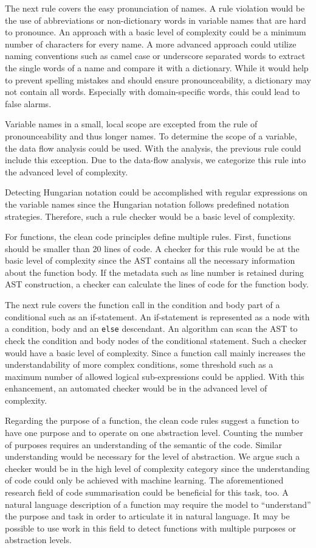 The next rule covers the easy pronunciation of names. A rule violation would be the use of abbreviations or non-dictionary words in variable names that are hard to pronounce. An approach with a basic level of complexity could be a minimum number of characters for every name. A more advanced approach could utilize naming conventions such as camel case or underscore separated words to extract the single words of a name and compare it with a dictionary. While it would help to prevent spelling mistakes and should ensure pronounceability, a dictionary may not contain all words. Especially with domain-specific words, this could lead to false alarms.

Variable names in a small, local scope are excepted from the rule of pronounceability and thus longer names. To determine the scope of a variable, the data flow analysis could be used. With the analysis, the previous rule could include this exception. Due to the data-flow analysis, we categorize this rule into the advanced level of complexity.

Detecting Hungarian notation could be accomplished with regular expressions on the variable names since the Hungarian notation follows predefined notation strategies. Therefore, such a rule checker would be a basic level of complexity.


For functions, the clean code principles define multiple rules. 
First, functions should be smaller than 20 lines of code. A checker for this rule would be at the basic level of complexity since the AST contains all the necessary information about the function body. If the metadata such as line number is retained during AST construction, a checker can calculate the lines of code for the function body.

The next rule covers the function call in the condition and body part of a conditional such as an if-statement. An if-statement is represented as a node with a condition, body and an \texttt{else} descendant. An algorithm can scan the AST to check the condition and body nodes of the conditional statement. Such a checker would have a basic level of complexity. Since a function call mainly increases the understandability of more complex conditions, some threshold such as a maximum number of allowed logical sub-expressions could be applied. With this enhancement, an automated checker would be in the advanced level of complexity.

Regarding the purpose of a function, the clean code rules suggest a function to have one purpose and to operate on one abstraction level. Counting the number of purposes requires an understanding of the semantic of the code. Similar understanding would be necessary for the level of abstraction. We argue such a checker would be in the high level of complexity category since the understanding of code could only be achieved with machine learning. The aforementioned research field of code summarisation could be beneficial for this task, too. A natural language description of a function may require the model to \enquote{understand} the purpose and task in order to articulate it in natural language. It may be possible to use work in this field to detect functions with multiple purposes or abstraction levels.
 
